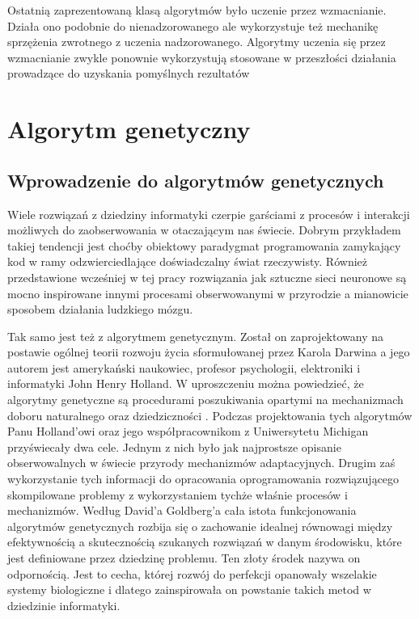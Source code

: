 \documentclass[12pt, oneside, a4paper]{report}
\begin{document}
Ostatnią zaprezentowaną klasą algorytmów było uczenie przez wzmacnianie. Działa ono podobnie do nienadzorowanego ale wykorzystuje też mechanikę sprzężenia zwrotnego z uczenia nadzorowanego. Algorytmy uczenia się przez wzmacnianie zwykle ponownie wykorzystują stosowane w przeszłości działania prowadzące do uzyskania pomyślnych rezultatów \citep{roelants2017deeplearning}


\chapter{Algorytm genetyczny}
\section{Wprowadzenie do algorytmów genetycznych}

Wiele rozwiązań z dziedziny informatyki czerpie garściami z procesów i interakcji możliwych do zaobserwowania w otaczającym nas świecie. Dobrym przykładem takiej tendencji jest choćby obiektowy paradygmat programowania zamykający kod w ramy odzwierciedlające doświadczalny świat rzeczywisty. Również przedstawione wcześniej w tej pracy rozwiązania jak sztuczne sieci neuronowe są mocno inspirowane innymi procesami obserwowanymi w przyrodzie a mianowicie sposobem działania ludzkiego mózgu. 

Tak samo jest też z algorytmem genetycznym. Został on zaprojektowany na postawie ogólnej teorii rozwoju życia sformułowanej przez Karola Darwina a jego autorem jest amerykański naukowiec, profesor psychologii, elektroniki i informatyki John Henry Holland. W uproszczeniu można powiedzieć, że algorytmy genetyczne są procedurami poszukiwania opartymi na mechanizmach doboru naturalnego oraz dziedziczności \citep{goldberg1995algorytmygenetyczne}. Podczas projektowania tych algorytmów Panu Holland'owi oraz jego współpracownikom z Uniwersytetu Michigan przyświecały dwa cele. Jednym z nich było jak najprostsze opisanie obserwowalnych w świecie przyrody mechanizmów adaptacyjnych. Drugim zaś wykorzystanie tych informacji do opracowania oprogramowania rozwiązującego skompilowane problemy z wykorzystaniem tychże właśnie procesów i mechanizmów. Według David'a Goldberg'a cała istota funkcjonowania algorytmów genetycznych rozbija się o zachowanie idealnej równowagi między efektywnością a skutecznością szukanych rozwiązań w danym środowisku, które jest definiowane przez dziedzinę problemu. Ten złoty środek nazywa on odpornością. Jest to cecha, której rozwój do perfekcji opanowały wszelakie systemy biologiczne i dlatego zainspirowała on powstanie takich metod w dziedzinie informatyki.
\end{document}
